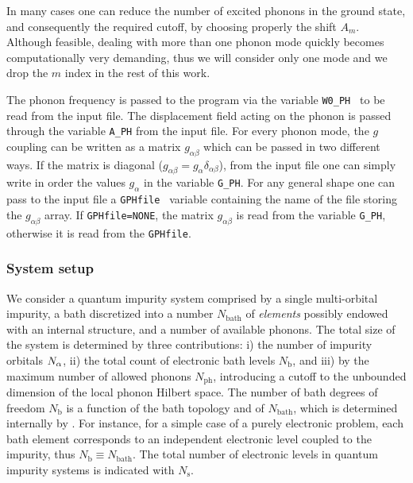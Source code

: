 \documentclass[edipack_sp.tex]{subfiles}
\begin{document}
In many cases one can reduce the number of excited phonons in the ground state, and consequently the required cutoff, by choosing properly the shift $A_m$.  
Although feasible, dealing with more than one phonon mode quickly becomes computationally very demanding, thus we will consider only one mode and we drop the $m$ index in the rest of this work.

The phonon frequency is passed to the \NAME program via the variable { \tt W0\_PH } to be read from the input file. The displacement field acting on the phonon is passed through the variable {\tt A\_PH} from the input file. For every phonon mode, the $g$ coupling can be written as a matrix $g_{\alpha \beta}$ which can be passed in two different ways. If the matrix is diagonal ($g_{\alpha \beta} = g_\alpha \delta_{\alpha \beta}$), from the input file one can simply write in order the values $g_\alpha$ in the variable {\tt G\_PH}. For any general shape one can pass to the input file a {\tt GPHfile } variable containing the name of the file storing the $g_{\alpha \beta}$ array.
If {\tt GPHfile=NONE}, the matrix $g_{\alpha\beta}$ is read from the variable {\tt G\_PH}, otherwise it is read from the {\tt GPHfile}.

\subsubsection{System setup}
We consider a quantum impurity system comprised by a single multi-orbital impurity, a bath discretized into a number $N_\mathrm{bath}$ of {\it elements} possibly endowed with an internal structure, and a number of available phonons. 
The total size of the system is determined by three contributions: i) the number of impurity orbitals $N_\alpha$, ii) the total count of electronic bath levels $N_\mathrm{b}$, and iii) by the maximum  number of allowed phonons $N_\mathrm{ph}$, introducing a cutoff to the unbounded dimension of the local phonon Hilbert space.
The number of bath degrees of freedom $N_\mathrm{b}$ is a
function of the bath topology and of $N_\mathrm{bath}$, which is determined internally by \NAME.
For instance, for a simple case of a purely electronic problem, each bath
element corresponds to an independent electronic level coupled to the
impurity, thus $N_\mathrm{b}\equiv N_\mathrm{bath}$. 
The total number of electronic levels in quantum impurity systems is indicated with $N_\mathrm{s}$.
\end{document}
